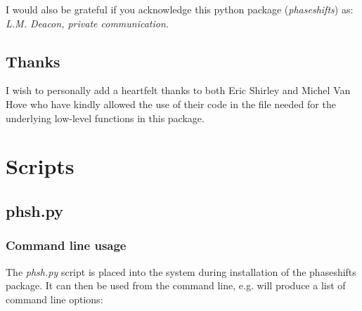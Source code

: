 \documentclass[letterpaper,10pt,english]{sphinxmanual}
\begin{document}
I would also be grateful if you acknowledge this python package (\emph{phaseshifts}) as:
\emph{L.M. Deacon, private communication.}


\section{Thanks}
\label{acknowledgements:thanks}
I wish to personally add a heartfelt thanks to both Eric Shirley and Michel Van Hove
who have kindly allowed the use of their code in the  file needed for the
underlying low-level functions in this package.


\chapter{Scripts}
\label{scripts:id1}\label{scripts::doc}\label{scripts:scripts}

\section{phsh.py}
\label{scripts:phsh-py}

\subsection{Command line usage}
\label{scripts:command-line-usage}
The \emph{phsh.py} script is placed into the system  during installation of the
phaseshifts package. It can then be used from the command line, e.g. 
will produce a list of command line options:
\end{document}
